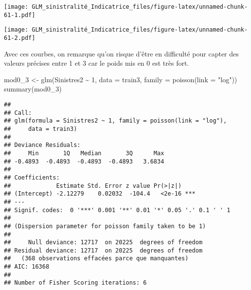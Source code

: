 \documentclass[
]{article}
\newenvironment{Shaded}{\begin{snugshade}}{\end{snugshade}}
\newcommand{\AttributeTok}[1]{\textcolor[rgb]{0.77,0.63,0.00}{#1}}
\newcommand{\DecValTok}[1]{\textcolor[rgb]{0.00,0.00,0.81}{#1}}
\newcommand{\FunctionTok}[1]{\textcolor[rgb]{0.00,0.00,0.00}{#1}}
\newcommand{\NormalTok}[1]{#1}
\newcommand{\OtherTok}[1]{\textcolor[rgb]{0.56,0.35,0.01}{#1}}
\newcommand{\SpecialCharTok}[1]{\textcolor[rgb]{0.00,0.00,0.00}{#1}}
\newcommand{\StringTok}[1]{\textcolor[rgb]{0.31,0.60,0.02}{#1}}
\begin{document}
\begin{Shaded}
\end{Shaded}

\texttt{[image: GLM\_sinistralité\_Indicatrice\_files/figure-latex/unnamed-chunk-61-1.pdf]}

\begin{Shaded}
\end{Shaded}

\texttt{[image: GLM\_sinistralité\_Indicatrice\_files/figure-latex/unnamed-chunk-61-2.pdf]}

Avec ces courbes, on remarque qu'on risque d'être en difficulté pour
capter des valeurs précises entre 1 et 3 car le poids mis en 0 est très
fort.

\begin{Shaded}
\begin{Highlighting}[]
\NormalTok{mod0\_3 }\OtherTok{\textless{}{-}} \FunctionTok{glm}\NormalTok{(Sinistres2 }\SpecialCharTok{\textasciitilde{}} \DecValTok{1}\NormalTok{, }\AttributeTok{data =}\NormalTok{ train3, }\AttributeTok{family =} \FunctionTok{poisson}\NormalTok{(}\AttributeTok{link =} \StringTok{"log"}\NormalTok{))}
\FunctionTok{summary}\NormalTok{(mod0\_3)}
\end{Highlighting}
\end{Shaded}

\begin{verbatim}
## 
## Call:
## glm(formula = Sinistres2 ~ 1, family = poisson(link = "log"), 
##     data = train3)
## 
## Deviance Residuals: 
##     Min       1Q   Median       3Q      Max  
## -0.4893  -0.4893  -0.4893  -0.4893   3.6834  
## 
## Coefficients:
##             Estimate Std. Error z value Pr(>|z|)    
## (Intercept) -2.12279    0.02032  -104.4   <2e-16 ***
## ---
## Signif. codes:  0 '***' 0.001 '**' 0.01 '*' 0.05 '.' 0.1 ' ' 1
## 
## (Dispersion parameter for poisson family taken to be 1)
## 
##     Null deviance: 12717  on 20225  degrees of freedom
## Residual deviance: 12717  on 20225  degrees of freedom
##   (368 observations effacées parce que manquantes)
## AIC: 16368
## 
## Number of Fisher Scoring iterations: 6
\end{verbatim}
\end{document}

